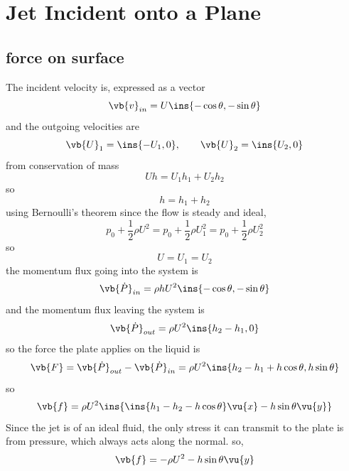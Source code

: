 \clearpage
\section{Jet Incident onto a Plane}
\subsection{force on surface}
The incident velocity is, expressed as a vector 
\begin{equation}
	\vb{v}_{in} = U\ins{-\cos\theta,-\sin\theta}
\end{equation}
and the outgoing velocities are 
\begin{equation}
	\vb{U}_1=\ins{-U_1,0},\qquad\vb{U}_2=\ins{U_2,0}
\end{equation}
from conservation of mass 
\begin{equation}
	Uh = U_1 h_1 + U_2 h_2
\end{equation}
so 
\begin{equation}
	h=h_1+h_2
\end{equation}
using Bernoulli's theorem since the flow is steady and ideal,
\begin{equation}
	p_0+\frac{1}{2}\rho U^2 = p_0+\frac{1}{2}\rho U_1^2 = p_0+\frac{1}{2}\rho U_2^2
\end{equation}
so 
\begin{equation}
	U=U_1=U_2
\end{equation}
the momentum flux going into the system is 
\begin{equation}
	\vb{\dot{P}}_{in}=\rho h U^2\ins{-\cos\theta,-\sin\theta}
\end{equation}
and the momentum flux leaving the system is 
\begin{equation}
	\vb{\dot{P}}_{out}=\rho U^2\ins{h_2-h_1,0}
\end{equation}
so the force the plate applies on the liquid is 
\begin{equation}
	\vb{F} = \vb{\dot{P}}_{out}-\vb{\dot{P}}_{in} = \rho U^2 \ins{h_2-h_1+h\cos\theta,h\sin\theta}
\end{equation}
so 
\begin{equation}
	\vb{f} = \rho U^2 \ins{\ins{h_1-h_2-h\cos\theta}\vu{x}-h\sin\theta\vu{y}}
\end{equation}
Since the jet is of an ideal fluid, the only stress it can transmit to the plate is from pressure, which always acts along the normal. so,
\begin{equation}
	\vb{f} = -\rho U^2-h\sin\theta\vu{y}
\end{equation}

